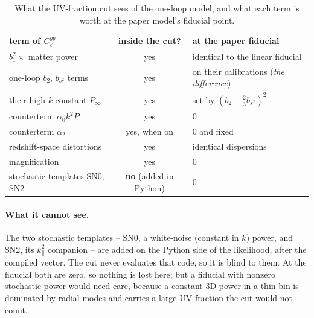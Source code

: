 \documentclass[11pt]{article}
\begin{document}
\begin{table}[tbp]
  \centering
  \small
  \begin{tabular}{lcl}
    \hline
    term of $C_\ell^{gg}$ & inside the cut? & at the paper fiducial \\
    \hline
    $b_1^2 \times$ matter power    & yes & identical to the linear fiducial \\
    one-loop $b_2$, $b_{s^2}$ terms & yes & on their calibrations
      (\emph{the difference}) \\
    their high-$k$ constant $P_\infty$ & yes & set by
      $(b_2 + \tfrac{2}{3} b_{s^2})^2$ \\
    counterterm $\alpha_0 k^2 P$   & yes & $0$ \\
    counterterm $\alpha_2$         & yes, when on & $0$ and fixed \\
    redshift-space distortions     & yes & identical dispersions \\
    magnification                  & yes & $0$ \\
    stochastic templates SN0, SN2  & \textbf{no} (added in Python) & $0$ \\
    \hline
  \end{tabular}
  \caption{What the UV-fraction cut sees of the one-loop model, and
    what each term is worth at the paper model's fiducial point.}
  \label{tab:terms}
\end{table}

\paragraph{What it cannot see.}
The two stochastic templates -- SN0, a white-noise (constant in $k$)
power, and SN2, its $k_\parallel^2$ companion -- are added on the
Python side of the likelihood, after the compiled vector.  The cut
never evaluates that code, so it is blind to them.  At the fiducial
both are zero, so nothing is lost here; but a fiducial with nonzero
stochastic power would need care, because a constant 3D power in a
thin bin is dominated by radial modes and carries a large UV
fraction the cut would not count.
\end{document}
